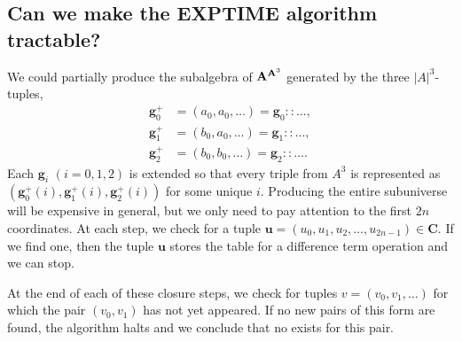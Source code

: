     \subsection{Can we make the {\small EXPTIME} algorithm tractable?}
    We could partially produce the subalgebra of $\mathbf{A}^{\mathbf{A}^3}$ generated by
    the three $|A|^3$-tuples,
    \begin{align*}
    \mathbf{g}^+_0 &= (a_0, a_0, \dots) = \mathbf{g}_0 :: \dots,\\
    \mathbf{g}^+_1 &= (b_0, a_0, \dots) = \mathbf{g}_1 :: \dots,\\
    \mathbf{g}^+_2 &= (b_0, b_0, \dots) = \mathbf{g}_2 :: \dots.
    \end{align*}
    Each $\mathbf{g}_i$ $(i=0,1,2)$ is extended so that every
    triple from $A^3$ is represented as $(\mathbf{g}^+_0(i), \mathbf{g}^+_1(i), \mathbf{g}^+_2(i))$ for some
    unique $i$.  Producing the entire subuniverse will be expensive in
    general, but we only need to pay attention to the first $2n$ coordinates.
    At each step, we check for a tuple $\mathbf{u} = (u_0, u_1, u_2, \dots, u_{2n-1})\in \mathbf{C}$.
    If we find one, then the tuple $\mathbf{u}$ stores
    the table for a difference term operation and we can stop.

    At the end of each of these closure steps, we check for
    tuples $v = (v_0, v_1, \dots)$ for which the pair $(v_0, v_1)$ has not
    yet appeared.  If no new pairs of this form are found, the algorithm halts
    and we conclude that no \ldto exists for this pair.







  















